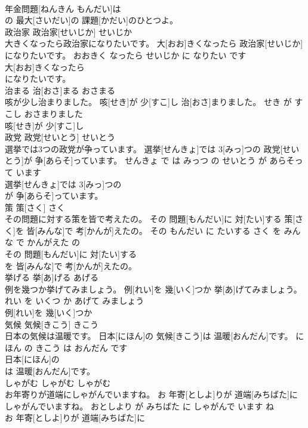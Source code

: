 \documentclass[8pt]{extreport}
\begin{document}
\begin{CJK}{UTF8}{min}
\\	年金問題[ねんきん もんだい]は
\\	の 最大[さいだい]の 課題[かだい]のひとつよ。			
\\	政治家	政治家[せいじか]	せいじか	
\\	大きくなったら政治家になりたいです。	大[おお]きくなったら 政治家[せいじか]になりたいです。	おおきく なったら せいじか に なりたい です	
\\	大[おお]きくなったら
\\	になりたいです。			
\\	治まる	治[おさ]まる	おさまる	
\\	咳が少し治まりました。	咳[せき]が 少[すこ]し 治[おさ]まりました。	せき が すこし おさまりました	
\\	咳[せき]が 少[すこ]し
\\	政党	政党[せいとう]	せいとう	
\\	選挙では3つの政党が争っています。	選挙[せんきょ]では 3[みっ]つの 政党[せいとう]が 争[あらそ]っています。	せんきょ で は みっつ の せいとう が あらそって います	
\\	選挙[せんきょ]では 3[みっ]つの
\\	が 争[あらそ]っています。			
\\	策	策[さく]	さく	
\\	その問題に対する策を皆で考えたの。	その 問題[もんだい]に 対[たい]する 策[さく]を 皆[みんな]で 考[かんが]えたの。	その もんだい に たいする さく を みんな で かんがえた の	
\\	その 問題[もんだい]に 対[たい]する
\\	を 皆[みんな]で 考[かんが]えたの。			
\\	挙げる	挙[あ]げる	あげる	
\\	例を幾つか挙げてみましょう。	例[れい]を 幾[いく]つか 挙[あ]げてみましょう。	れい を いくつ か あげて みましょう	
\\	例[れい]を 幾[いく]つか
\\	気候	気候[きこう]	きこう	
\\	日本の気候は温暖です。	日本[にほん]の 気候[きこう]は 温暖[おんだん]です。	にほん の きこう は おんだん です	
\\	日本[にほん]の
\\	は 温暖[おんだん]です。			
\\	しゃがむ	しゃがむ	しゃがむ	
\\	お年寄りが道端にしゃがんでいますね。	お 年寄[としよ]りが 道端[みちばた]にしゃがんでいますね。	おとしより が みちばた に しゃがんで います ね	
\\	お 年寄[としよ]りが 道端[みちばた]に

\end{CJK}
\end{document}
